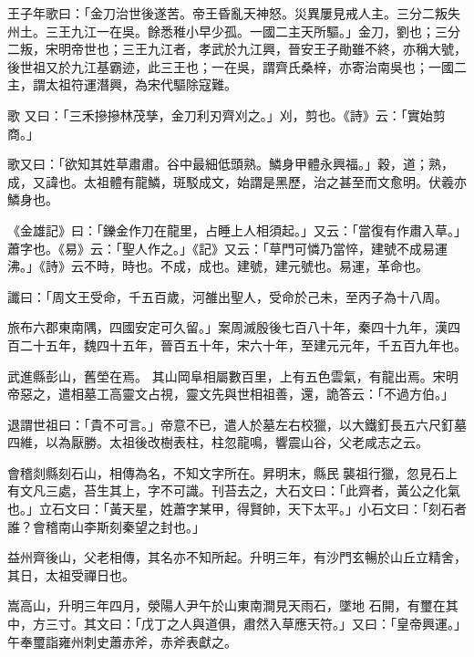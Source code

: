 \begin{pinyinscope}
 王子年歌曰：「金刀治世後遂苦。帝王昏亂天神怒。災異屢見戒人主。三分二叛失州土。三王九江一在吳。餘悉稚小早少孤。一國二主天所驅。」金刀，劉也；三分二叛，宋明帝世也；三王九江者，孝武於九江興，晉安王子勛雖不終，亦稱大號，後世祖又於九江基霸迹，此三王也；一在吳，謂齊氏桑梓，亦寄治南吳也；一國二主，謂太祖符運潛興，為宋代驅除寇難。



 歌
 又曰：「三禾摻摻林茂孳，金刀利刃齊刈之。」刈，剪也。《詩》云：「實始剪商。」



 歌又曰：「欲知其姓草肅肅。谷中最細低頭熟。鱗身甲體永興福。」穀，道；熟，成，又諱也。太祖體有龍鱗，斑駁成文，始謂是黑歷，治之甚至而文愈明。伏羲亦鱗身也。



 《金雄記》曰：「鑠金作刀在龍里，占睡上人相須起。」又云：「當復有作肅入草。」蕭字也。《易》云：「聖人作之。」《記》又云：「草門可憐乃當悴，建號不成易運沸。」《詩》云不時，時也。不成，成也。建號，建元號也。易運，革命也。



 讖曰：「周文王受命，千五百歲，河雒出聖人，受命於己未，至丙子為十八周。



 旅布六郡東南隅，四國安定可久留。」案周滅殷後七百八十年，秦四十九年，漢四百二十五年，魏四十五年，晉百五十年，宋六十年，至建元元年，千五百九年也。



 武進縣彭山，舊塋在焉。
 其山岡阜相屬數百里，上有五色雲氣，有龍出焉。宋明帝惡之，遣相墓工高靈文占視，靈文先與世相祖善，還，詭答云：「不過方伯。」



 退謂世祖曰：「貴不可言。」帝意不已，遣人於墓左右校獵，以大鐵釘長五六尺釘墓四維，以為厭勝。太祖後改樹表柱，柱忽龍鳴，響震山谷，父老咸志之云。



 會稽剡縣刻石山，相傳為名，不知文字所在。昇明末，縣民襲祖行獵，忽見石上有文凡三處，苔生其上，字不可識。刊苔去之，大石文曰：「此齊者，黃公之化氣也。」立石文曰：「黃天星，姓蕭字某甲，得賢帥，天下太平。」小石文曰：「刻石者誰？會稽南山李斯刻秦望之封也。」



 益州齊後山，父老相傳，其名亦不知所起。升明三年，有沙門玄暢於山丘立精舍，其日，太祖受禪日也。



 嵩高山，升明三年四月，滎陽人尹午於山東南澗見天雨石，墜地
 石開，有璽在其中，方三寸。其文曰：「戊丁之人與道俱，肅然入草應天符。」又曰：「皇帝興運。」午奉璽詣雍州刺史蕭赤斧，赤斧表獻之。




\end{pinyinscope}
